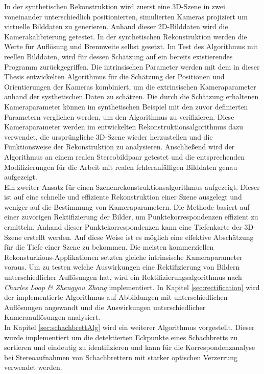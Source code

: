 In der synthetischen Rekonstruktion wird zuerst eine 3D-Szene in zwei voneinander unterschiedlich positionierten, simulierten Kameras projiziert um virtuelle Bilddaten zu generieren. Anhand dieser 2D-Bilddaten wird die Kamerakalibrierung getestet. In der synthetischen Rekonstruktion werden die Werte für Auflösung und Brennweite selbst gesetzt. Im Test des Algorithmus mit reellen Bilddaten, wird für dessen Schätzung auf ein bereits existierendes Programm zurückgegriffen. Die intrinsischen Parameter werden mit dem in dieser Thesis entwickelten Algorithmus für die Schätzung der Positionen und Orientierungen der Kameras kombiniert, um die extrinsischen Kameraparameter anhand der systhetischen Daten zu schätzen.  Die durch die Schätzung erhaltenen Kameraparameter können im synthetischen Beispiel mit den zuvor definierten Parametern verglichen werden, um den Algorithmus zu verifizieren. Diese Kameraparameter werden im entwickelten Rekonstruktionsalgorithmus dazu verwendet, die ursprüngliche 3D-Szene wieder herzustellen und die Funktionsweise der Rekonstruktion zu analysieren. Anschließend wird der Algorithmus an einem realen Stereobildpaar getestet und die entsprechenden Modifizierungen für die Arbeit mit realen fehleranfälligen Bilddaten genau aufgezeigt. \\

Ein zweiter Ansatz für einen Szenenrekonstruktionsalgorithmus aufgezeigt. Dieser ist auf eine schnelle und effiziente Rekonstruktion einer Szene ausgelegt und weniger auf die Bestimmung von Kameraparametern. Die Methode basiert auf einer zuvorigen Rektifizierung der Bilder, um Punktekorrespondenzen effizient zu ermitteln. Anhand dieser Punktekorrespondenzen kann eine Tiefenkarte der 3D-Szene erstellt werden. Auf diese Weise ist es möglich eine effektive Abschätzung für die Tiefe einer Szene zu bekommen. Die meisten kommerziellen Rekonsturkions-Applikationen setzten gleiche intrinsische Kameraparameter voraus. Um zu testen welche Auswirkungen eine Rektifizierung von Bildern unterschiedlicher Auflösungen hat, wird ein Rektifizierungsalgorithmus nach \textit{Charles Loop \& Zhengyou Zhang} implementiert. In Kapitel \ref{sec:rectification} wird der implementierte Algorithmus auf Abbildungen mit unterschiedlichen Auflösungen angewandt und die Auswirkungen unterschiedlicher Kameraauflösungen analysiert. \\


In Kapitel \ref{sec:schachbrettAlg} wird ein weiterer Algorithmus vorgestellt. Dieser wurde implementiert um die detektierten Eckpunkte eines Schachbretts zu sortieren und eindeutig zu identifizieren und kann für die Korrespondenzanalyse bei Stereoaufnahmen von Schachbrettern mit starker optischen Verzerrung verwendet werden. 



